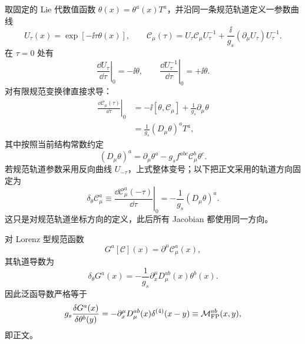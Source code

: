 \begin{derivation}
取固定的 Lie 代数值函数 $\theta(x)=\theta^a(x)T^a$，并沿同一条规范轨道定义一参数曲线
\begin{equation*}
 U_\tau(x)=\exp[-\ii\tau\theta(x)],
 \qquad
 \mathscr C_\mu(\tau)
 =U_\tau\mathscr C_\mu U_\tau^{-1}
 +\frac{\ii}{g_s}(\partial_\mu U_\tau)U_\tau^{-1}.
\end{equation*}
在 $\tau=0$ 处有
\begin{equation*}
 \left.\frac{\dd U_\tau}{\dd\tau}\right|_0=-\ii\theta,
 \qquad
 \left.\frac{\dd U_\tau^{-1}}{\dd\tau}\right|_0=+\ii\theta .
\end{equation*}
对有限规范变换律直接求导：
\begin{align*}
 \left.\frac{\dd\mathscr C_\mu(\tau)}{\dd\tau}\right|_0
 &=-\ii[\theta,\mathscr C_\mu]
 +\frac1{g_s}\partial_\mu\theta\\
 &=\frac1{g_s}(D_\mu\theta)^aT^a,
\end{align*}
其中按照当前结构常数约定
\begin{equation*}
 (D_\mu\theta)^a
 =\partial_\mu\theta^a-g_sf^{abc}\mathscr C_\mu^b\theta^c.
\end{equation*}
若规范轨道参数采用反向曲线 $U_{-\tau}$，上式整体变号；以下把正文采用的轨道方向固定为
\begin{equation*}
 \delta_\theta\mathscr C_\mu^a
 \equiv
 \left.\frac{\dd\mathscr C_\mu^a(-\tau)}{\dd\tau}\right|_0
 =-\frac1{g_s}(D_\mu\theta)^a.
\end{equation*}
这只是对规范轨道坐标方向的定义，此后所有 Jacobian 都使用同一方向。

对 Lorenz 型规范函数
\begin{equation*}
 G^a[\mathscr C](x)=\partial^\mu\mathscr C_\mu^a(x),
\end{equation*}
其轨道导数为
\begin{equation*}
 \delta_\theta G^a(x)
 =-\frac1{g_s}\partial_x^\mu D_\mu^{ab}(x)\theta^b(x).
\end{equation*}
因此泛函导数严格等于
\begin{equation*}
 g_s\frac{\delta G^a(x)}{\delta\theta^b(y)}
 =-\partial_x^\mu D_\mu^{ab}(x)\delta^{(4)}(x-y)
 \equiv\mathcal M_{\rm FP}^{ab}(x,y),
\end{equation*}
即正文。


\end{derivation}

